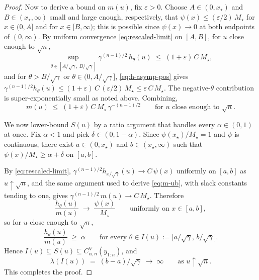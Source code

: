 \documentclass[12pt, a4paper]{report}
\newcommand{\1}{\mathbf{1}}
\begin{document}
\begin{proof}
Now to derive a bound on $m(u)$, fix $\varepsilon > 0$. Choose $A \in (0, x_\star)$
and $B \in (x_\star, \infty)$ small and large enough, respectively, that
$\psi(x) \leq (\varepsilon/2)\, M_\star$ for $x \in (0, A]$ and for $x \in [B,\infty)$;
this is possible since $\psi(x) \to 0$ at both endpoints of $(0,\infty)$.
By uniform convergence \eqref{eq:rescaled-limit} on $[A,B]$, for $u$ close
enough to $\sqrt n$,
\begin{equation}\label{eq:on-compact-ub}
  \sup_{\theta \in [A/\sqrt\gamma,\,B/\sqrt\gamma]}
    \gamma^{(n-1)/2}\,h_\theta(u)
  \;\leq\; (1+\varepsilon)\,C\,M_\star,
\end{equation}
and for $\theta > B/\sqrt\gamma$ or $\theta \in (0, A/\sqrt\gamma]$,
\eqref{eq:h-asymp-pos} gives
$\gamma^{(n-1)/2} h_\theta(u) \leq (1+\varepsilon)\, C\, (\varepsilon/2)\, M_\star
 \leq \varepsilon\, C\, M_\star$.
The negative-$\theta$ contribution is super-exponentially small as noted
above. Combining,
\begin{equation}\label{eq:m-ub}
  m(u) \;\leq\; (1+\varepsilon)\,C\,M_\star\,\gamma^{-(n-1)/2}
  \qquad \text{for } u \text{ close enough to } \sqrt n.
\end{equation}

We now lower-bound $S(u)$ by a ratio argument that handles every
$\alpha \in (0,1)$ at once. Fix $\alpha < 1$ and pick
$\delta \in (0, 1-\alpha)$. Since $\psi(x_\star)/M_\star = 1$ and $\psi$
is continuous, there exist $a \in (0, x_\star)$ and $b \in (x_\star, \infty)$
such that $\psi(x)/M_\star \geq \alpha + \delta$ on $[a,b]$.

By \eqref{eq:rescaled-limit}, $\gamma^{(n-1)/2} h_{x/\sqrt\gamma}(u) \to C\,\psi(x)$
uniformly on $[a,b]$ as $u\uparrow\sqrt n$, and the same argument used to
derive \eqref{eq:m-ub}, with slack constants tending to one, gives
$\gamma^{(n-1)/2}\,m(u) \to C\,M_\star$. Therefore
\[
   \frac{h_\theta(u)}{m(u)}
   \;\longrightarrow\;\frac{\psi(x)}{M_\star}
   \qquad\text{uniformly on } x \in [a,b],
\]
so for $u$ close enough to $\sqrt n$,
\[
   \frac{h_\theta(u)}{m(u)} \;\geq\; \alpha
   \qquad\text{for every } \theta \in I(u) := \bigl[a/\sqrt\gamma,\, b/\sqrt\gamma\bigr].
\]
Hence $I(u) \subseteq S(u) \subseteq C_{\alpha,n}^V(y_{1:n})$, and
\[
   \lambda(I(u)) \;=\; (b-a)/\sqrt\gamma \;\longrightarrow\;\infty
   \qquad\text{as } u\uparrow\sqrt n.
\]
This completes the proof.


\end{proof}
\end{document}
